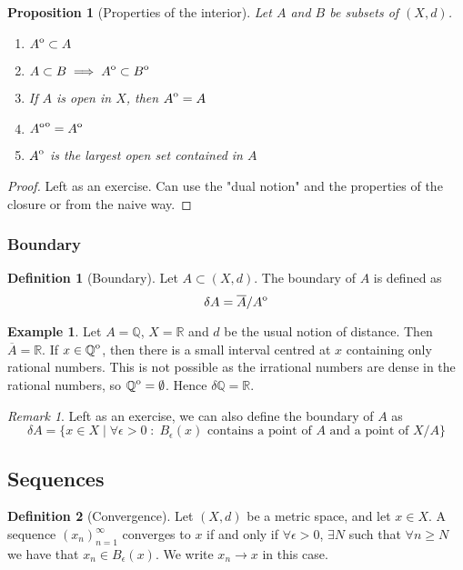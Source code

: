 \documentclass{article}
\theoremstyle{definition}
\newtheorem{defn}{Definition}[section]
\newtheorem{exmp}{Example}[section]
\theoremstyle{plain}%
\newtheorem{prop}[thm]{Proposition}
\theoremstyle{remark}
\newtheorem*{rem}{Remark}
\newcommand{\R}{\mathbb{R}}
\newcommand{\Q}{\mathbb{Q}}
\newcommand{\interior}[1]{%
  {\kern0pt#1}^{\mathrm{o}}%
}
\begin{document}
\begin{prop}[Properties of the interior]
Let $A$ and $B$ be subsets of $(X,d)$.
\begin{enumerate}
    \item $\interior{A} \subset A$
    \item $A \subset B \implies \interior{A} \subset \interior{B}$
    \item If $A$ is open in $X$, then $\interior{A} = A$
    \item $\interior{\interior{A}} = \interior{A}$
    \item $\interior{A}$ is the largest open set contained in $A$
\end{enumerate}
\end{prop}

\begin{proof}
Left as an exercise. Can use the "dual notion" and the properties of the closure or from the naive way.
\end{proof}

\subsubsection{Boundary}

\begin{defn}[Boundary]
Let $A \subset (X,d)$. The boundary of $A$ is defined as \[\delta A = \overline{A} / \interior{A}\]
\end{defn}

\begin{exmp}
Let $A = \Q$, $X = \R$ and $d$ be the usual notion of distance. Then $\overline{A} = \R$. If $x \in \interior{\Q}$, then there is a small interval centred at $x$ containing only rational numbers. This is not possible as the irrational numbers are dense in the rational numbers, so $\interior{\Q} = \emptyset$. Hence $\delta \Q = \R$.
\end{exmp}

\begin{rem}
Left as an exercise, we can also define the boundary of $A$ as \[\delta A = \{x \in X \; | \; \forall \epsilon > 0 \; : \; B_{\epsilon}(x) \text{ contains a point of } A \text{ and a point of } X / A\}\]
\end{rem}

\subsection{Sequences}

\begin{defn}[Convergence]
Let $(X,d)$ be a metric space, and let $x \in X$. A sequence $(x_n)_{n=1}^{\infty}$ converges to $x$ if and only if $\forall \epsilon > 0$, $\exists N$ such that $\forall n \ge N$ we have that $x_n \in B_{\epsilon}(x)$. We write $x_n \to x$ in this case.
\end{defn}
\end{document}
